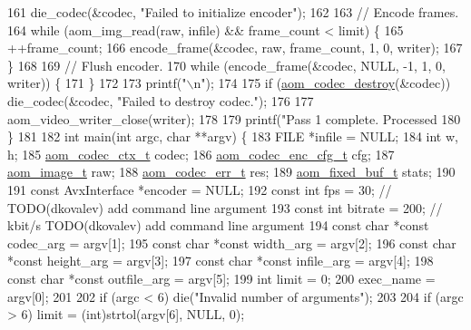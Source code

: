 \begin{DoxyCodeInclude}
{{{161     die\_codec(&codec, \textcolor{stringliteral}{"Failed to initialize encoder"});
162 
163   \textcolor{comment}{// Encode frames.}
164   \textcolor{keywordflow}{while} (aom\_img\_read(raw, infile) && frame\_count < limit) \{
165     ++frame\_count;
166     encode\_frame(&codec, raw, frame\_count, 1, 0, writer);
167   \}
168 
169   \textcolor{comment}{// Flush encoder.}
170   \textcolor{keywordflow}{while} (encode\_frame(&codec, NULL, -1, 1, 0, writer)) \{
171   \}
172 
173   printf(\textcolor{stringliteral}{"\(\backslash\)n"});
174 
175   \textcolor{keywordflow}{if} (\hyperlink{group__codec_ga9b60e186f61ba2d6ab2b8069b76a15c5}{aom\_codec\_destroy}(&codec)) die\_codec(&codec, \textcolor{stringliteral}{"Failed to destroy codec."});
176 
177   aom\_video\_writer\_close(writer);
178 
179   printf(\textcolor{stringliteral}{"Pass 1 complete. Processed %
180 \}
181 
182 \textcolor{keywordtype}{int} main(\textcolor{keywordtype}{int} argc, \textcolor{keywordtype}{char} **argv) \{
183   FILE *infile = NULL;
184   \textcolor{keywordtype}{int} w, h;
185   \hyperlink{structaom__codec__ctx}{aom\_codec\_ctx\_t} codec;
186   \hyperlink{structaom__codec__enc__cfg}{aom\_codec\_enc\_cfg\_t} cfg;
187   \hyperlink{structaom__image}{aom\_image\_t} raw;
188   \hyperlink{group__codec_gaaae61e0f8663e6137f1e228757248e7c}{aom\_codec\_err\_t} res;
189   \hyperlink{structaom__fixed__buf}{aom\_fixed\_buf\_t} stats;
190 
191   \textcolor{keyword}{const} AvxInterface *encoder = NULL;
192   \textcolor{keyword}{const} \textcolor{keywordtype}{int} fps = 30;       \textcolor{comment}{// TODO(dkovalev) add command line argument}
193   \textcolor{keyword}{const} \textcolor{keywordtype}{int} bitrate = 200;  \textcolor{comment}{// kbit/s TODO(dkovalev) add command line argument}
194   \textcolor{keyword}{const} \textcolor{keywordtype}{char} *\textcolor{keyword}{const} codec\_arg = argv[1];
195   \textcolor{keyword}{const} \textcolor{keywordtype}{char} *\textcolor{keyword}{const} width\_arg = argv[2];
196   \textcolor{keyword}{const} \textcolor{keywordtype}{char} *\textcolor{keyword}{const} height\_arg = argv[3];
197   \textcolor{keyword}{const} \textcolor{keywordtype}{char} *\textcolor{keyword}{const} infile\_arg = argv[4];
198   \textcolor{keyword}{const} \textcolor{keywordtype}{char} *\textcolor{keyword}{const} outfile\_arg = argv[5];
199   \textcolor{keywordtype}{int} limit = 0;
200   exec\_name = argv[0];
201 
202   \textcolor{keywordflow}{if} (argc < 6) die(\textcolor{stringliteral}{"Invalid number of arguments"});
203 
204   \textcolor{keywordflow}{if} (argc > 6) limit = (int)strtol(argv[6], NULL, 0);
}}}}
\end{DoxyCodeInclude}
